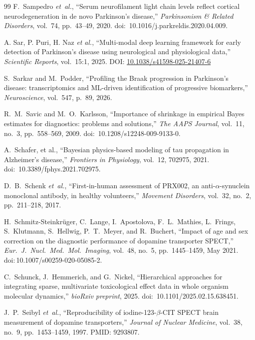 \begin{thebibliography}{99}
F.~Sampedro \textit{et~al.}, ``Serum neurofilament light chain levels reflect cortical neurodegeneration in de novo Parkinson's disease,'' \textit{Parkinsonism \& Related Disorders}, vol.~74, pp.~43--49, 2020. doi:~10.1016/j.parkreldis.2020.04.009.

A. Sar, P. Puri, H. Naz \textit{et al.},
``Multi-modal deep learning framework for early detection of Parkinson's disease using neurological and physiological data,''
\textit{Scientific Reports}, vol.~15:1, 2025. DOI: \href{https://doi.org/10.1038/s41598-025-21407-6}{10.1038/s41598-025-21407-6}

S.~Sarkar and M.~Podder, ``Profiling the Braak progression in Parkinson's disease: transcriptomics and ML-driven identification of progressive biomarkers,'' \textit{Neuroscience}, vol.~547, p.~89, 2026.

R.~M.~Savic and M.~O.~Karlsson, ``Importance of shrinkage in empirical Bayes estimates for diagnostics: problems and solutions,'' \textit{The AAPS Journal}, vol.~11, no.~3, pp.~558--569, 2009. doi:~10.1208/s12248-009-9133-0.

A.~Schafer, et al., ``Bayesian physics-based modeling of tau propagation in Alzheimer's disease,'' \textit{Frontiers in Physiology}, vol.~12, 702975, 2021. doi:~10.3389/fphys.2021.702975.

D.~B.~Schenk \textit{et~al.}, ``First-in-human assessment of PRX002, an anti-$\alpha$-synuclein monoclonal antibody, in healthy volunteers,'' \textit{Movement Disorders}, vol.~32, no.~2, pp.~211--218, 2017.

H.~Schmitz-Steinkr\"{u}ger, C.~Lange, I.~Apostolova, F.~L.~Mathies, L.~Frings, S.~Klutmann, S.~Hellwig, P.~T.~Meyer, and R.~Buchert, ``Impact of age and sex correction on the diagnostic performance of dopamine transporter SPECT,'' \textit{Eur.\ J.\ Nucl.\ Med.\ Mol.\ Imaging}, vol.~48, no.~5, pp.~1445--1459, May 2021. doi:\,10.1007/s00259-020-05085-2.

C.~Schunck, J.~Hemmerich, and G.~Nickel, ``Hierarchical approaches for integrating sparse, multivariate toxicological effect data in whole organism molecular dynamics,'' \textit{bioRxiv preprint}, 2025. doi:~10.1101/2025.02.15.638451.

J.~P.~Seibyl \textit{et~al.}, ``Reproducibility of iodine-123-$\beta$-CIT SPECT brain measurement of dopamine transporters,'' \textit{Journal of Nuclear Medicine}, vol.~38, no.~9, pp.~1453--1459, 1997. PMID: 9293807.


\end{thebibliography}
